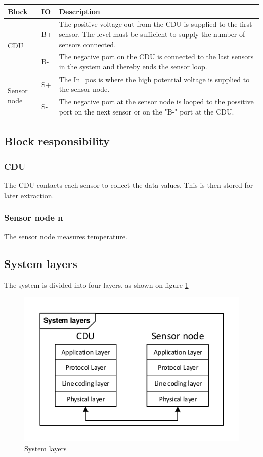 \begin{table}[H]
	\begin{center}
		\begin{tabular}{|p{2.5cm}|p{1cm}| p{9cm}| }
			\hline
			\textbf{Block} & \textbf{IO} & \textbf{Description} \\\hline
			\multirow{2}{2.5cm}[-2em]{CDU} & B+& The positive voltage out from the CDU is supplied to the first sensor. The level must be sufficient to supply the number of sensors connected.\\ \cline{2-3}
 & B-  & The negative port on the CDU is connected to the last sensors in the system and thereby ends the sensor loop. \\ \hline
			\multirow{2}{2.5cm}[-2em]{Sensor node} & S+ &The In\_pos is where the high potential voltage is supplied to the sensor node. \\ \cline{2-3}
& S- & The negative port at the sensor node is looped to the possitive port on the next sensor or on the "B-" port at the CDU. \\ \hline
		\end{tabular}
	\end{center}
\end{table}

\subsection{Block responsibility}
\subsubsection{CDU}
The CDU contacts each sensor to collect the data values. This is then stored for later extraction.

\subsubsection{Sensor node n}
The sensor node measures temperature.

\subsection{System layers}
The system is divided into four layers, as shown on figure \ref{fig:system_layers}

\begin{figure}[H]
	\centering
	\includegraphics[width=.7\textwidth]{billeder/system_layers}
	\caption{System layers}
	\label{fig:system_layers}
\end{figure}

